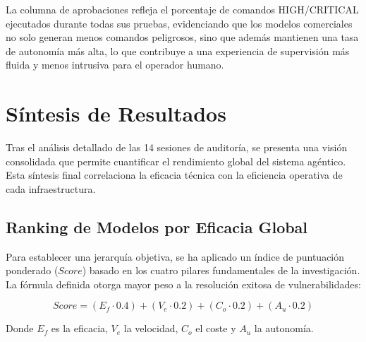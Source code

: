 La columna de aprobaciones refleja el porcentaje de comandos HIGH/CRITICAL ejecutados durante todas sus pruebas, evidenciando que los modelos comerciales no solo generan menos comandos peligrosos, sino que además mantienen una tasa de autonomía más alta, lo que contribuye a una experiencia de supervisión más fluida y menos intrusiva para el operador humano.




\section{Síntesis de Resultados}
\label{sec:sintesis_resultados}

Tras el análisis detallado de las 14 sesiones de auditoría, se presenta una visión consolidada que permite cuantificar el rendimiento global del sistema agéntico. Esta síntesis final correlaciona la eficacia técnica con la eficiencia operativa de cada infraestructura.

\subsection{Ranking de Modelos por Eficacia Global}

Para establecer una jerarquía objetiva, se ha aplicado un índice de puntuación ponderado ($Score$) basado en los cuatro pilares fundamentales de la investigación. La fórmula definida otorga mayor peso a la resolución exitosa de vulnerabilidades:

\begin{equation}
Score = (E_{f} \cdot 0.4) + (V_{e} \cdot 0.2) + (C_{o} \cdot 0.2) + (A_{u} \cdot 0.2)
\end{equation}

Donde $E_{f}$ es la eficacia, $V_{e}$ la velocidad, $C_{o}$ el coste y $A_{u}$ la autonomía.

